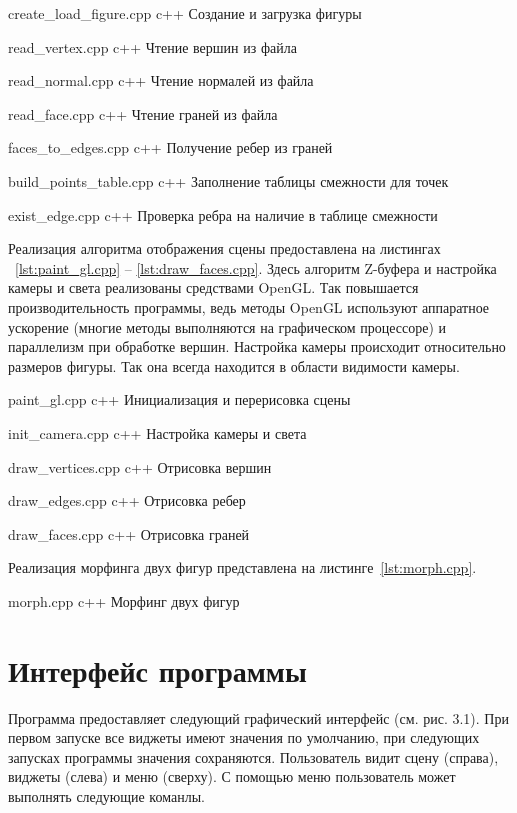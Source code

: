 {create_load_figure.cpp}
{c++}
{Создание и загрузка фигуры}

{read_vertex.cpp}
{c++}
{Чтение вершин из файла}

{read_normal.cpp}
{c++}
{Чтение нормалей из файла}

{read_face.cpp}
{c++}
{Чтение граней из файла}

{faces_to_edges.cpp}
{c++}
{Получение ребер из граней}

{build_points_table.cpp}
{c++}
{Заполнение таблицы смежности для точек}

{exist_edge.cpp}
{c++}
{Проверка ребра на наличие в таблице смежности}


Реализация алгоритма отображения сцены предоставлена на листингах ~\ref{lst:paint_gl.cpp} -- \ref{lst:draw_faces.cpp}. 
Здесь алгоритм Z-буфера и настройка камеры и света реализованы средствами OpenGL.
Так повышается производительность программы, ведь методы OpenGL используют аппаратное ускорение (многие методы выполняются на графическом процессоре) и параллелизм при обработке вершин. 
Настройка камеры происходит относительно размеров фигуры. 
Так она всегда находится в области видимости камеры.

{paint_gl.cpp}
{c++}
{Инициализация и перерисовка сцены}

{init_camera.cpp}
{c++}
{Настройка камеры и света}

{draw_vertices.cpp}
{c++}
{Отрисовка вершин}

{draw_edges.cpp}
{c++}
{Отрисовка ребер}

{draw_faces.cpp}
{c++}
{Отрисовка граней}

\newpage

Реализация морфинга двух фигур представлена на листинге~\ref{lst:morph.cpp}.

{morph.cpp}
{c++}
{Морфинг двух фигур}


\section{Интерфейс программы}

Программа предоставляет следующий графический интерфейс (см. рис. 3.1). 
При первом запуске все виджеты имеют значения по умолчанию, при следующих запусках программы значения сохраняются.
Пользователь видит сцену (справа), виджеты (слева) и меню (сверху).
С помощью меню пользователь может выполнять следующие команлы.

